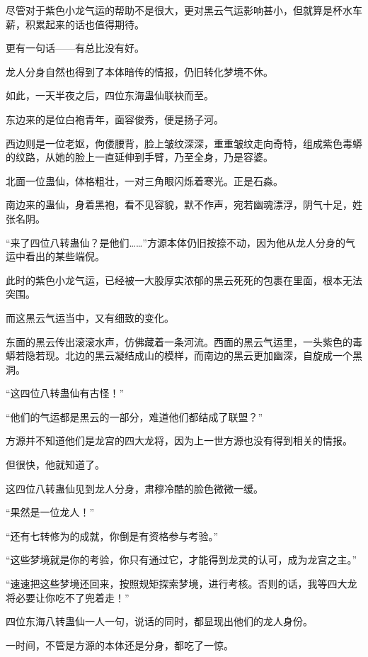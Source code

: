 \begin{this_body}
尽管对于紫色小龙气运的帮助不是很大，更对黑云气运影响甚小，但就算是杯水车薪，积累起来的话也值得期待。

更有一句话——有总比没有好。

龙人分身自然也得到了本体暗传的情报，仍旧转化梦境不休。

如此，一天半夜之后，四位东海蛊仙联袂而至。

东边来的是位白袍青年，面容俊秀，便是扬子河。

西边则是一位老妪，佝偻腰背，脸上皱纹深深，重重皱纹走向奇特，组成紫色毒蟒的纹路，从她的脸上一直延伸到手臂，乃至全身，乃是容婆。

北面一位蛊仙，体格粗壮，一对三角眼闪烁着寒光。正是石淼。

南边来的蛊仙，身着黑袍，看不见容貌，默不作声，宛若幽魂漂浮，阴气十足，姓张名阴。

“来了四位八转蛊仙？是他们……”方源本体仍旧按捺不动，因为他从龙人分身的气运中看出的某些端倪。

此时的紫色小龙气运，已经被一大股厚实浓郁的黑云死死的包裹在里面，根本无法突围。

而这黑云气运当中，又有细致的变化。

东面的黑云传出滚滚水声，仿佛藏着一条河流。西面的黑云气运里，一头紫色的毒蟒若隐若现。北边的黑云凝结成山的模样，而南边的黑云更加幽深，自旋成一个黑洞。

“这四位八转蛊仙有古怪！”

“他们的气运都是黑云的一部分，难道他们都结成了联盟？”

方源并不知道他们是龙宫的四大龙将，因为上一世方源也没有得到相关的情报。

但很快，他就知道了。

这四位八转蛊仙见到龙人分身，肃穆冷酷的脸色微微一缓。

“果然是一位龙人！”

“还有七转修为的成就，你倒是有资格参与考验。”

“这些梦境就是你的考验，你只有通过它，才能得到龙灵的认可，成为龙宫之主。”

“速速把这些梦境还回来，按照规矩探索梦境，进行考核。否则的话，我等四大龙将必要让你吃不了兜着走！”

四位东海八转蛊仙一人一句，说话的同时，都显现出他们的龙人身份。

一时间，不管是方源的本体还是分身，都吃了一惊。

\end{this_body}

